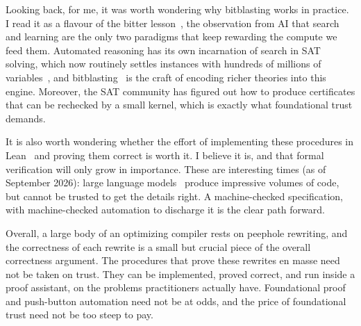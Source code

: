 Looking back, for me, it was worth wondering why bitblasting works in practice.
I read it as a flavour of the bitter lesson~\citep{sutton2019bitter},
the observation from AI that search and learning are the only two paradigms that keep rewarding the compute we feed them.
Automated reasoning has its own incarnation of search in SAT solving,
which now routinely settles instances with hundreds of millions of variables~\citep{biere2024cadical,kissatSATComp2024},
and bitblasting~\citep{tseitin1983complexity} is the craft of encoding richer theories into this engine.
Moreover, the SAT community has figured out how to produce certificates that can be rechecked by a small kernel,
which is exactly what foundational trust demands.

It is also worth wondering whether the effort of implementing these procedures in Lean~\citep{demoura2021lean}
and proving them correct is worth it. I believe it is, and that formal verification will only grow in importance.
These are interesting times (as of September 2026): large language models~\citep{brown2020language,touvron2023llama}
produce impressive volumes of code, but cannot be trusted to get the details right.
A machine-checked specification, with machine-checked automation to discharge it is the clear path forward.

Overall, a large body of an optimizing compiler rests on peephole rewriting,
and the correctness of each rewrite is a small but crucial piece of the overall correctness argument.
The procedures that prove these rewrites en masse need not be taken on trust.
They can be implemented, proved correct, and run inside a proof assistant,
on the problems practitioners actually have.
Foundational proof and push-button automation need not be at odds,
and the price of foundational trust need not be too steep to pay.

